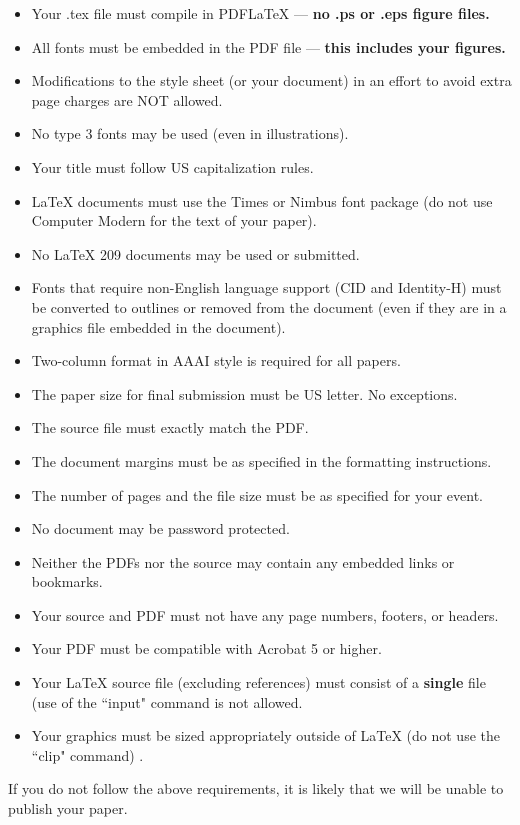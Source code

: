 \documentclass[letterpaper]{article}
\begin{document}
\begin{itemize}
\item Your .tex file must compile in PDF\LaTeX{} --- \textbf{ no .ps or .eps figure files.}
\item All fonts must be embedded in the PDF file --- \textbf{ this includes your figures.}
\item Modifications to the style sheet (or your document) in an effort to avoid extra page charges are NOT allowed.
\item No type 3 fonts may be used (even in illustrations).
\item Your title must follow US capitalization rules.
\item \LaTeX{} documents must use the Times or Nimbus font package (do not use Computer Modern for the text of your paper).
\item No \LaTeX{} 209 documents may be used or submitted.
\item Fonts that require non-English language support (CID and Identity-H) must be converted to outlines or removed from the document (even if they are in a graphics file embedded in the document). 
\item Two-column format in AAAI style is required for all papers.
\item The paper size for final submission must be US letter. No exceptions.
\item The source file must exactly match the PDF.
\item The document margins must be as specified in the formatting instructions.
\item The number of pages and the file size must be as specified for your event.
\item No document may be password protected.
\item Neither the PDFs nor the source may contain any embedded links or bookmarks.
\item Your source and PDF must not have any page numbers, footers, or headers.
\item Your PDF must be compatible with Acrobat 5 or higher.
\item Your \LaTeX{} source file (excluding references) must consist of a \textbf{single} file (use of the ``input" command is not allowed.
\item Your graphics must be sized appropriately outside of \LaTeX{} (do not use the ``clip" command) .
\end{itemize}

If you do not follow the above requirements, it is likely that we will be unable to publish your paper.
\end{document}
